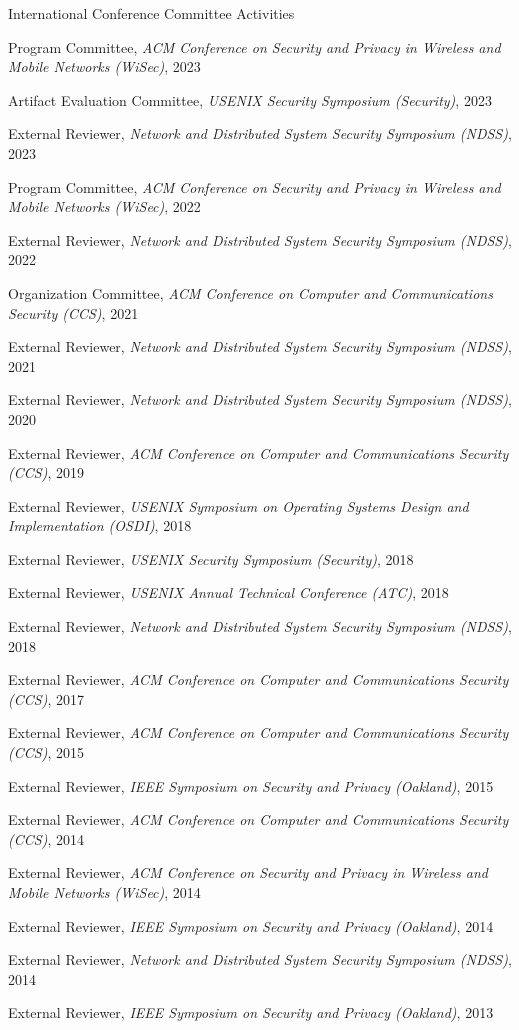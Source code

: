\documentclass[11pt,letterpaper]{article}
\begin{document}
\begin{centry}{International Conference Committee Activities}{}
  \item{Program Committee, \emph{ACM Conference on Security and Privacy in Wireless and Mobile Networks (WiSec)}, 2023}
  \item{Artifact Evaluation Committee, \emph{USENIX Security Symposium (Security)}, 2023}
  \item{External Reviewer, \emph{Network and Distributed System Security Symposium (NDSS)}, 2023}
  \item{Program Committee, \emph{ACM Conference on Security and Privacy in Wireless and Mobile Networks (WiSec)}, 2022}
  \item{External Reviewer, \emph{Network and Distributed System Security Symposium (NDSS)}, 2022}
  \item{Organization Committee, \emph{ACM Conference on Computer and Communications Security (CCS)}, 2021}
  \item{External Reviewer, \emph{Network and Distributed System Security Symposium (NDSS)}, 2021}
  \item{External Reviewer, \emph{Network and Distributed System Security Symposium (NDSS)}, 2020}
  \item{External Reviewer, \emph{ACM Conference on Computer and Communications Security (CCS)}, 2019}
  \item{External Reviewer, \emph{USENIX Symposium on Operating Systems Design and Implementation (OSDI)}, 2018}
  \item{External Reviewer, \emph{USENIX Security Symposium (Security)}, 2018}
  \item{External Reviewer, \emph{USENIX Annual Technical Conference (ATC)}, 2018}
  \item{External Reviewer, \emph{Network and Distributed System Security Symposium (NDSS)}, 2018}
  \item{External Reviewer, \emph{ACM Conference on Computer and Communications Security (CCS)}, 2017}
  \item{External Reviewer, \emph{ACM Conference on Computer and Communications Security (CCS)}, 2015}
  \item{External Reviewer, \emph{IEEE Symposium on Security and Privacy (Oakland)}, 2015}
  \item{External Reviewer, \emph{ACM Conference on Computer and Communications Security (CCS)}, 2014}
  \item{External Reviewer, \emph{ACM Conference on Security and Privacy in Wireless and Mobile Networks (WiSec)}, 2014}
  \item{External Reviewer, \emph{IEEE Symposium on Security and Privacy (Oakland)}, 2014}
  \item{External Reviewer, \emph{Network and Distributed System Security Symposium (NDSS)}, 2014}
  \item{External Reviewer, \emph{IEEE Symposium on Security and Privacy (Oakland)}, 2013}
\end{centry}
\end{document}

